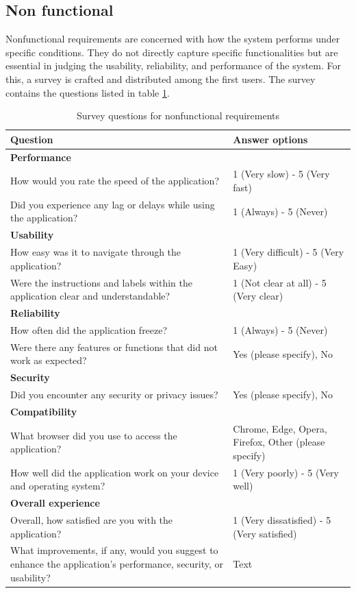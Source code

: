 \subsection{Non functional}

Nonfunctional requirements are concerned with how the system performs under specific conditions. They do not directly capture specific functionalities but are essential in judging the usability, reliability, and performance of the system. For this, a survey is crafted and distributed among the first users. The survey contains the questions listed in table \ref{tab:non-func-req}.

\begin{table}[!h]
    \centering
    \begin{tabular}{p{8cm} p{6cm}}
    \hline
        \textbf{Question} & \textbf{Answer options} \\ 
     \hline
        \textbf{Performance} & \\
        How would you rate the speed of the application? & 1 (Very slow) - 5 (Very fast) \\
        Did you experience any lag or delays while using the application? & 1 (Always) - 5 (Never) \\
     \hline
        \textbf{Usability} & \\
        How easy was it to navigate through the application? & 1 (Very difficult) - 5 (Very Easy) \\
        Were the instructions and labels within the application clear and understandable? & 1 (Not clear at all) - 5 (Very clear) \\
     \hline
        \textbf{Reliability} & \\
        How often did the application freeze? & 1 (Always) - 5 (Never) \\
        Were there any features or functions that did not work as expected? & Yes (please specify), No \\
     \hline
        \textbf{Security} & \\
        Did you encounter any security or privacy issues? & Yes (please specify), No \\
     \hline
        \textbf{Compatibility} & \\
        What browser did you use to access the application? & Chrome, Edge, Opera, Firefox, Other (please specify) \\
        How well did the application work on your device and operating system? & 1 (Very poorly) - 5 (Very well) \\
     \hline
        \textbf{Overall experience} & \\
        Overall, how satisfied are you with the application? & 1 (Very dissatisfied) - 5 (Very satisfied) \\
        What improvements, if any, would you suggest to enhance the application’s performance, security, or usability? & Text \\
        
    \end{tabular}
    \caption{Survey questions for nonfunctional requirements}
    \label{tab:non-func-req}
\end{table}

